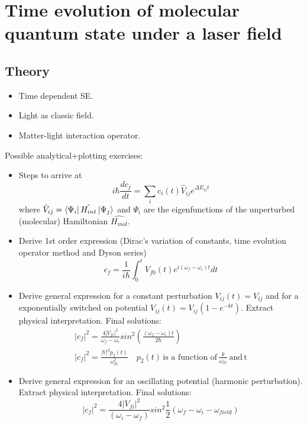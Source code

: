 \documentclass[12pt]{article}
\begin{document}
\section{Time evolution of molecular quantum state under a laser field}

\subsection{Theory}
\begin{itemize}
\item Time dependent SE. 
\item Light as classic field.  
\item Matter-light interaction operator.  
\end{itemize}
Possible analytical+plotting exercises: \\
\begin{itemize}
\item Steps to arrive at 
\begin{equation}
i\hbar\frac{dc_j}{dt}=\sum_i c_i(t)\hat{V}_{ij}e^{\Delta E_{ij}t}
\end{equation}
where $\hat{V}_{ij}=\bra{\Psi_i}\hat{H_{int}}\ket{\Psi_j}$ and $\Psi_i$ are the eigenfunctions of the unperturbed (molecular) Hamiltonian $\hat{H_{mol}}$. 
\item Derive 1st order expression (Dirac's variation of constants, time evolution operator method and Dyson series) 
\begin{equation}
c_f = \frac{1}{i\hbar}\int_0^t V_{f0}(t)e^{i(\omega_f-\omega_i)t}dt
\end{equation}
\item Derive general expression for a constant perturbation $V_{ij}(t) = V_{ij}$ and  for a exponentially switched on potential $V_{ij}(t)=V_{ij}(1-e^{-kt})$. Extract physical interpretation. Final solutions: 
\begin{eqnarray}
|c_f|^2=\frac{4|V_{fi}|^2}{\omega_f-\omega_i}sin^2(\frac{(\omega_f-\omega_i)t}{2\hbar}) \\
|c_f|^2=\frac{|V|^2p_2(t)}{\omega^2_{21}} \quad p_{2}(t) \, \textrm{is a function of} \, \frac{k}{\omega_{21}} \, \textrm{and} \, \textrm{t}
\end{eqnarray}
\item Derive general expression for an oscillating potential (harmonic perturbation). Extract physical interpretation. Final solutions:
\begin{equation}
|c_f|^2=\frac{4|V_{fi}|^2}{(\omega_i-\omega_f)}sin^2\frac{1}{2}(\omega_f-\omega_i-\omega_{field})
\end{equation}
\end{itemize}
\end{document}
